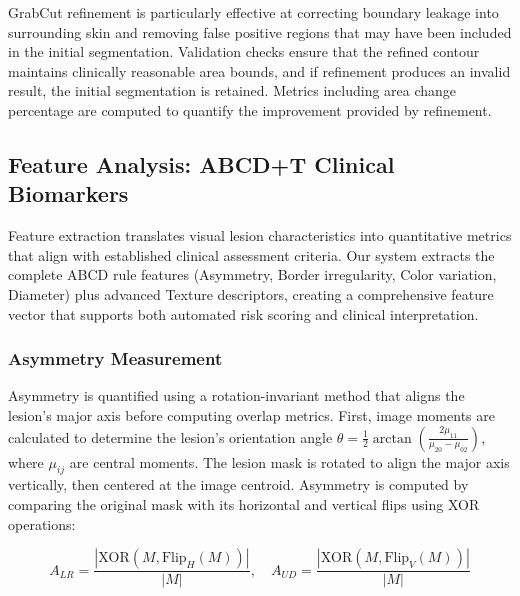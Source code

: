 \documentclass[conference]{IEEEtran}
\begin{document}
GrabCut refinement is particularly effective at correcting boundary leakage into surrounding skin and removing false positive regions that may have been included in the initial segmentation. Validation checks ensure that the refined contour maintains clinically reasonable area bounds, and if refinement produces an invalid result, the initial segmentation is retained. Metrics including area change percentage are computed to quantify the improvement provided by refinement.


\subsection{Feature Analysis: ABCD+T Clinical Biomarkers}

Feature extraction translates visual lesion characteristics into quantitative metrics that align with established clinical assessment criteria. Our system extracts the complete ABCD rule features (Asymmetry, Border irregularity, Color variation, Diameter) plus advanced Texture descriptors, creating a comprehensive feature vector that supports both automated risk scoring and clinical interpretation.

\subsubsection{Asymmetry Measurement}

Asymmetry is quantified using a rotation-invariant method that aligns the lesion's major axis before computing overlap metrics. First, image moments are calculated to determine the lesion's orientation angle $\theta = \frac{1}{2}\arctan\left(\frac{2\mu_{11}}{\mu_{20} - \mu_{02}}\right)$, where $\mu_{ij}$ are central moments. The lesion mask is rotated to align the major axis vertically, then centered at the image centroid. Asymmetry is computed by comparing the original mask with its horizontal and vertical flips using XOR operations:

\begin{equation}
A_{LR} = \frac{|\text{XOR}(M, \text{Flip}_H(M))|}{|M|}, \quad A_{UD} = \frac{|\text{XOR}(M, \text{Flip}_V(M))|}{|M|}
\end{equation}
\end{document}
